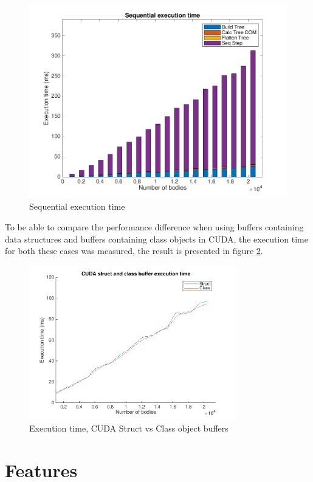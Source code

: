 \begin{figure}[H]
    \centering
    \includegraphics[width=.8\textwidth]{Results/Figs/SequentialBarChart.png}
    \caption{Sequential execution time}
    \label{fig:SeqExecTime}
\end{figure}


To be able to compare the performance difference when using buffers containing data structures and buffers containing class objects in CUDA, the execution time for both these cases was measured, the result is presented in figure \ref{fig:GraphCUDAStructVsClass}.

\begin{figure}[H]
    \centering
    \includegraphics[width=0.8\textwidth]{Results/Figs/CUDAStructVSClass.png}
    \caption{Execution time, CUDA Struct vs Class object buffers}
    \label{fig:GraphCUDAStructVsClass}
\end{figure}

\section{Features}


